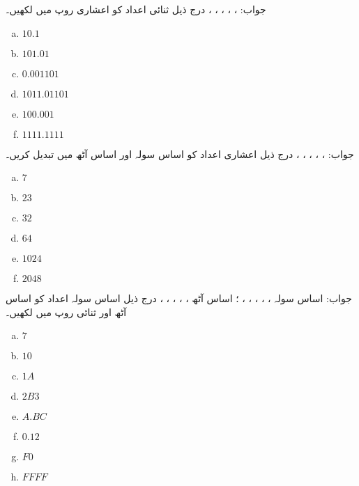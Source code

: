 جواب: ، ، ، ، ، 
درج ذیل ثنائی اعداد کو اعشاری روپ میں لکھیں۔
\begin{multicols}{4}
\begin{enumerate}[a.]

\item  
 
 \(10.1\)  
\item  
 
 \(101.01\)

\item  
 
 \(0.001101\) 
\item  
 
 \(1011.01101\)

\item  
 
 \(100.001\) 
\item  
 
 \(1111.1111\)
\end{enumerate}
\end{multicols}
جواب: ،   ،   ،   ،   ،   
درج ذیل اعشاری اعداد کو اساس سولہ اور اساس آٹھ میں تبدیل کریں۔
\begin{multicols}{4}
\begin{enumerate}[a.]

\item 
 \(7\) 
\item 
 \(23\) 
\item 
 \(32\) 
\item 
 \(64\)  

\item 
 \(1024\) 
\item 
 \(2048\)
\end{enumerate}
\end{multicols}
جواب:  اساس سولہ ، ، ، ، ، ؛ اساس آٹھ   ، ، ، ، ، 
درج ذیل اساس سولہ اعداد کو اساس آٹھ اور ثنائی روپ میں لکھیں۔
\begin{multicols}{4}
\begin{enumerate}[a.]

\item 
 \(7\) 
\item 
 \(10\) 
\item 
 \(1A\) 
\item 
 \(2B3\) 

\item 
 \(A.BC\) 
\item 
 \(0.12\) 
\item 
 \(F0\) 
\item 
 \(FFFF\)
\end{enumerate}
\end{multicols} 
